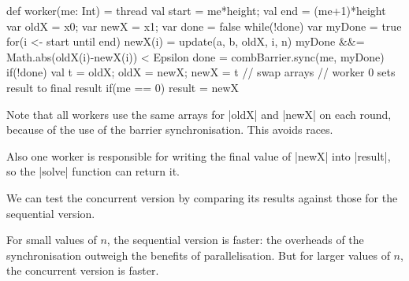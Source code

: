 \begin{slide}

\begin{scala}
    def worker(me: Int) = thread{
      val start = me*height; val end = (me+1)*height
      var oldX = x0; var newX = x1; var done = false
      while(!done){
        var myDone = true
        for(i <- start until end){
          newX(i) = update(a, b, oldX, i, n)
          myDone &&= Math.abs(oldX(i)-newX(i)) < Epsilon
        }
        done = combBarrier.sync(me, myDone)
        if(!done){ val t = oldX; oldX = newX; newX = t } // swap arrays
      }
      // worker 0 sets result to final result
      if(me == 0) result = newX
    }
\end{scala}

\end{slide}


\begin{slide}

Note that all workers use the same arrays for |oldX| and |newX| on each round,
because of the use of the barrier synchronisation.  This avoids races. 

Also one worker is responsible for writing the final value of |newX| into
|result|, so the |solve| function can return it.
\end{slide}


\begin{slide}

We can test the concurrent version by comparing its results against those for
the sequential version.


For small values of $n$, the sequential version is faster: the overheads of
the synchronisation outweigh the benefits of parallelisation.  But for larger
values of $n$, the concurrent version is faster.
\end{slide}

